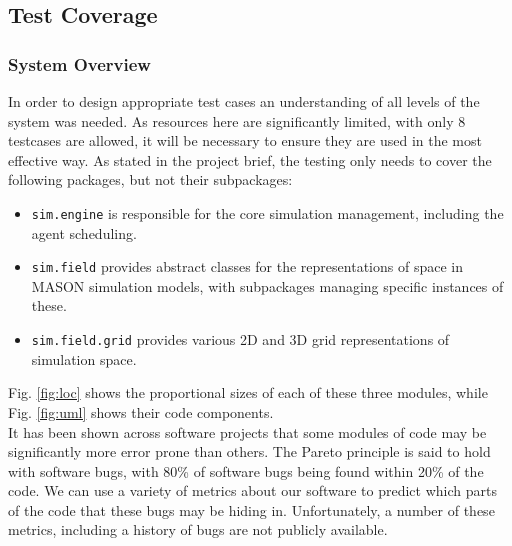 \documentclass[11pt]{article}
\begin{document}
\subsection{Test Coverage}
\subsubsection{System Overview}
In order to design appropriate test cases an understanding of all levels of the system was needed. As resources here are significantly limited, with only 8 testcases are allowed, it will be necessary to ensure they are used in the most effective way.
As stated in the project brief, the testing only needs to cover the following packages, but not their subpackages:

\begin{itemize}
\item \texttt{sim.engine} is responsible for the core simulation management, including the agent scheduling.
\item \texttt{sim.field} provides abstract classes for the representations of space in MASON simulation models, with subpackages managing specific instances of these.
\item \texttt{sim.field.grid} provides various 2D and 3D grid representations of simulation space.
\end{itemize}

Fig. \ref{fig:loc} shows the proportional sizes of each of these three modules, while Fig. \ref{fig:uml} shows their code components. 
\\

It has been shown across software projects that some modules of code may be significantly more error prone than others.
The Pareto principle is said to hold with software bugs, with 80\% of software bugs being found within 20\% of the code\cite[pp. 124]{pressman}.
We can use a variety of metrics about our software to predict which parts of the code that these bugs may be hiding in\cite{predicting_from_history}.
Unfortunately, a number of these metrics, including a history of bugs are not publicly available.
\\
\end{document}
